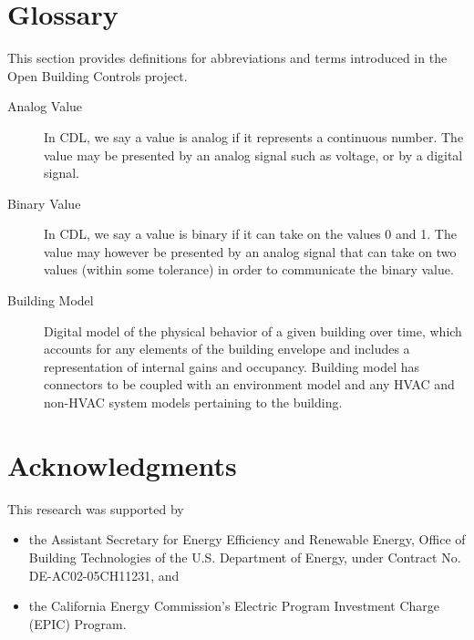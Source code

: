 \documentclass[letterpaper,10pt, openany,english]{sphinxmanual}
\begin{document}
\chapter{Glossary}
\label{\detokenize{glossary:glossary}}\label{\detokenize{glossary:sec-glossary}}\label{\detokenize{glossary::doc}}
This section provides definitions for abbreviations and terms introduced in
the Open Building Controls project.
\begin{description}
\item[{Analog Value\label{\detokenize{glossary:term-analog-value}}}] \leavevmode
In CDL, we say a value is analog if it represents a continuous
number. The value may be presented by an analog signal such as
voltage, or by a digital signal.

\item[{Binary Value\label{\detokenize{glossary:term-binary-value}}}] \leavevmode
In CDL, we say a value is binary if it can take on the values
0 and 1. The value may however be presented by an analog signal
that can take on two values (within some tolerance) in order
to communicate the binary value.

\item[{Building Model\label{\detokenize{glossary:term-building-model}}}] \leavevmode
Digital model of the physical behavior of a given building over time,
which accounts for any elements of the building envelope and includes a
representation of internal gains and occupancy. Building model has connectors
to be coupled with an environment model and any HVAC and non-HVAC system models
pertaining to the building.

\end{description}


\chapter{Acknowledgments}
\label{\detokenize{acknowledgments:acknowledgments}}\label{\detokenize{acknowledgments::doc}}
This research was supported by
\begin{itemize}
\item {} 
the Assistant Secretary for
Energy Efficiency and Renewable Energy, Office of Building Technologies
of the U.S. Department of Energy, under Contract No. DE-AC02-05CH11231, and

\item {} 
the California Energy Commission’s Electric Program Investment Charge (EPIC) Program.

\end{itemize}
\end{document}
